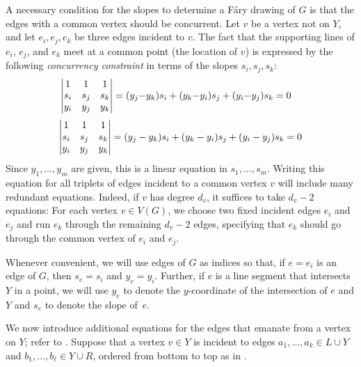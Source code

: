 A necessary condition for the slopes to determine a F\'ary drawing of
$G$ is that the %
edges 
with a common vertex should be concurrent. Let $v$ be a vertex 
not on $Y$, and let $e_i, e_j, e_k$ be three edges incident to $v$.
The fact that the supporting lines of $e_i$, $e_j$, and $e_k$
meet at a common point (the location of $v$) is expressed by the following
\emph{concurrency constraint} in terms of the slopes $s_i,s_j,s_k$:
\ifSODA
\begin{align}\eqlabel{slope0} 
\left|
\begin{matrix}
1&1&1\\
s_i&s_j&s_k\\
y_i&y_j&y_k
\end{matrix}
\right|&=
({y_j{-}y_k}) s_i + ({y_k{-}y_i}) s_j 
         + ({y_i{-}y_j})s_k  %
                               = 0
\end{align}
\else
\begin{equation}\eqlabel{slope0} 
\left|
\begin{matrix}
1&1&1\\
s_i&s_j&s_k\\
y_i&y_j&y_k
\end{matrix}
\right|=
({y_j-y_k}) s_i + ({y_k-y_i}) s_j 
+ ({y_i-y_j})s_k  = 0
\end{equation}
\fi
Since $y_1,\ldots,y_m$ are given, this is a linear equation
in $s_1,\ldots,s_m$.
Writing this equation for all triplets of edges incident to a common
vertex $v$ will include many redundant equations. Indeed,
if $v$ has degree $d_v$,
it suffices to take $d_v-2$ equations: For each vertex $v\in V(G)$, we choose two fixed
incident edges $e_i$ and $e_j$ and run $e_k$ through the remaining
$d_v-2$ edges, specifying that $e_k$ should go through the common vertex
of $e_i$ and $e_j$.

Whenever convenient, we will use edges of $G$
as indices so that, if $e=e_i$ is an edge of $G$, then $s_e=s_i$
and $y_e=y_i$.  Further, if $e$ is a line segment that
intersects $Y$ in a point, we will use $y_e$ to denote the $y$-coordinate
of the intersection of $e$ and $Y$ and $s_e$ to denote the slope of~$e$. %


We now introduce additional equations for the edges that emanate from a
vertex on $Y$; refer to .
Suppose that a vertex $v\in Y$ is incident to edges $a_1,\ldots,a_k\in L\cup Y$ 
and $b_1,\ldots,b_\ell\in Y\cup R$, ordered from bottom to top as in .

